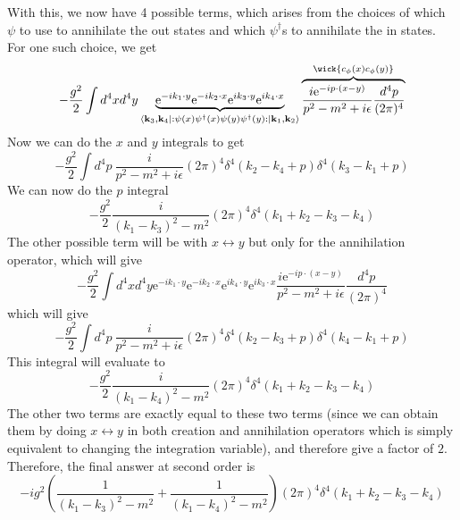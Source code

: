 \documentclass[11pt, notitlepage]{report}
\newcommand{\e}{\mathrm{e}}
\newcommand{\normord}[1]{:\mathrel{#1}:}
\renewcommand{\c}[1]{c_\mathbf{#1}}
\numberwithin{equation}{section}
\begin{document}
    With this, we now have 4 possible terms, which arises from the choices of which \(\psi\) to use to annihilate the out states and which \(\psi^\dagger\)s to annihilate the in states. For one such choice, we get 
    \begin{equation*}
        -\frac{g^2}{2} \int d^4x d^4y \underbrace{\e^{-ik_1\cdot y}\e^{-ik_2\cdot x}\e^{ik_3\cdot y}\e^{ik_4\cdot x}}_{\bra{\textbf{k}_3, \textbf{k}_4}\normord{\psi(x) \psi^\dagger(x) \psi(y) \psi^\dagger(y)}\ket{\textbf{k}_1, \textbf{k}_2}}  
        \overbrace{\frac{i\e^{-ip\cdot(x-y)}}{p^2 -m^2 + i\epsilon}\frac{d^4p}{(2\pi)^4}}^{ \wick{\c\phi(x)\c\phi(y)} }
    \end{equation*}
    Now we can do the \(x\) and \(y\) integrals to get 
    \begin{equation*}
        -\frac{g^2}{2} \int d^4p~
       \frac{i}{p^2 -m^2 + i\epsilon}(2\pi)^4\delta^4(k_2 - k_4 + p) \delta^4(k_3 - k_1 + p)
    \end{equation*}
    We can now do the \(p\) integral
    \begin{equation*}
        -\frac{g^2}{2} \frac{i}{(k_1-k_3)^2 - m^2} (2\pi)^4 \delta^4(k_1 + k_2 - k_3 - k_4)
    \end{equation*}
    The other possible term will be with \(x\leftrightarrow y\) but only for the annihilation operator, which will give 
    \begin{equation*}
        -\frac{g^2}{2} \int d^4x d^4y\e^{-ik_1\cdot y}\e^{-ik_2\cdot x}\e^{ik_4\cdot y}\e^{ik_3\cdot x}\frac{i\e^{-ip\cdot(x-y)}}{p^2 -m^2 + i\epsilon}\frac{d^4p}{(2\pi)^4}
    \end{equation*}
    which will give 
    \begin{equation*}
         -\frac{g^2}{2} \int d^4p~  \frac{i}{p^2 -m^2 + i\epsilon}(2\pi)^4\delta^4(k_2 - k_3 + p) \delta^4(k_4 - k_1 + p)
    \end{equation*}
    This integral will evaluate to 
    \begin{equation*}
        -\frac{g^2}{2} \frac{i}{(k_1-k_4)^2 - m^2} (2\pi)^4 \delta^4(k_1 + k_2 - k_3 - k_4)
    \end{equation*}    
    The other two terms are exactly equal to these two terms (since we can obtain them by doing \(x\leftrightarrow y\) in both creation and annihilation operators which is simply equivalent to changing the integration variable), and therefore give a factor of \(2\). Therefore, the final answer at second order is 
    \begin{equation*}
        -ig^2 \left(  \frac{1}{(k_1-k_3)^2 - m^2}  +   \frac{1}{(k_1-k_4)^2 - m^2}  \right)(2\pi)^4 \delta^4(k_1 + k_2 - k_3 - k_4)
    \end{equation*}
\end{document}
